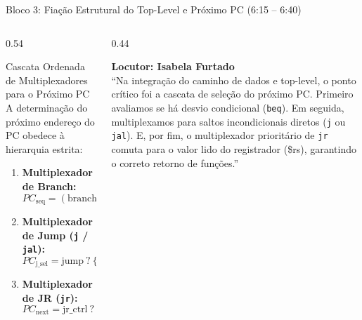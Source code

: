 \documentclass[aspectratio=169, 10pt]{beamer}
\begin{document}
\begin{frame}{Bloco 3: Fiação Estrutural do Top-Level e Próximo PC (6:15 -- 6:40)}
  \begin{columns}[T]
    \begin{column}{0.54\textwidth}
      \begin{block}{Cascata Ordenada de Multiplexadores para o Próximo PC}
        \footnotesize
        A determinação do próximo endereço do PC obedece à hierarquia estrita:
        \begin{enumerate}\setlength{\itemsep}{2pt}
          \item \textbf{Multiplexador de Branch:}
            $$PC_{\text{seq}} = (\text{branch} \land \text{zero}) \ ? \ PC_{\text{branch}} : PC+4$$
          \item \textbf{Multiplexador de Jump (\texttt{j} / \texttt{jal}):}
            $$PC_{\text{j\_sel}} = \text{jump} \ ? \ \{PC+4[31:28], \text{instr}[25:0], 2'b00\} : PC_{\text{seq}}$$
          \item \textbf{Multiplexador de JR (\texttt{jr}):}
            $$PC_{\text{next}} = \text{jr\_ctrl} \ ? \ \text{rdata1} : PC_{\text{j\_sel}}$$
        \end{enumerate}
      \end{block}
    \end{column}

    \begin{column}{0.44\textwidth}
      \begin{tcolorbox}[speakerbox]
        \textbf{Locutor: Isabela Furtado}\\
        \vspace{1mm}
        \scriptsize
        ``Na integração do caminho de dados e top-level, o ponto crítico foi a cascata de seleção do próximo PC.
        Primeiro avaliamos se há desvio condicional (\texttt{beq}). Em seguida, multiplexamos para saltos incondicionais diretos (\texttt{j} ou \texttt{jal}).
        E, por fim, o multiplexador prioritário de \texttt{jr} comuta para o valor lido do registrador (\$rs), garantindo o correto retorno de funções.''
      \end{tcolorbox}
    \end{column}
  \end{columns}
\end{frame}
\end{document}
